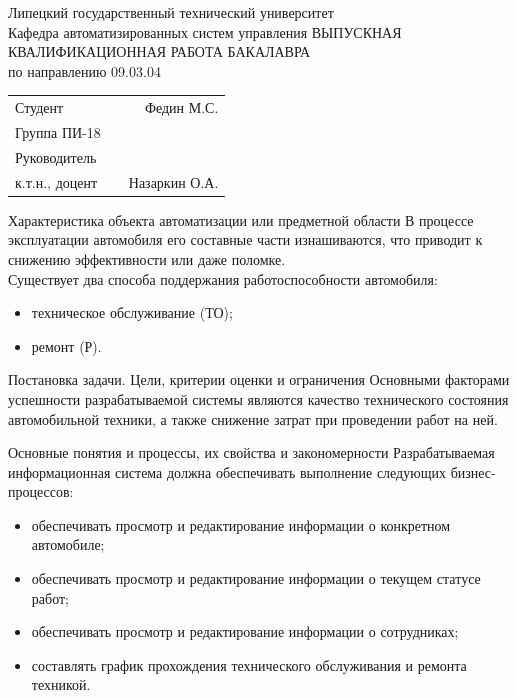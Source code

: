 \documentclass{beamer}
\begin{document}
\begin{frame}
    \begin{center}
        Липецкий государственный технический университет\\
        Кафедра автоматизированных систем управления
        \vfill
        \uppercase{ВЫПУСКНАЯ КВАЛИФИКАЦИОННАЯ РАБОТА БАКАЛАВРА}\\
        по направлению 09.03.04 \\
    \end{center}
    \vfill
    \begin{tabularx}{\textwidth}{Lm{4cm}R}
        Студент & & Федин М.С. \\
        Группа ПИ-18 & & \\
        Руководитель & & \\
        к.т.н., доцент & & Назаркин О.А.
    \end{tabularx}
\end{frame}

\begin{frame}
    {Характеристика объекта автоматизации или предметной области}
    В процессе эксплуатации автомобиля его составные части изнашиваются, что
    приводит к снижению эффективности или даже поломке.
    \\[\baselineskip]

    Существует два способа поддержания работоспособности автомобиля:
    \begin{itemize}
        \item техническое обслуживание (ТО);
        \item ремонт (Р).
    \end{itemize}
\end{frame}

\begin{frame}
	{Постановка задачи. Цели, критерии оценки и ограничения}
    Основными факторами успешности разрабатываемой системы являются качество
    технического состояния автомобильной техники, а также снижение затрат при
    проведении работ на ней.
\end{frame}

\begin{frame}
	{Основные понятия и процессы, их свойства и закономерности}
    Разрабатываемая информационная система должна обеспечивать выполнение
    следующих бизнес-процессов:
    \begin{itemize}
      \item обеспечивать просмотр и редактирование информации о конкретном
        автомобиле;
      \item обеспечивать просмотр и редактирование информации о текущем статусе
        работ;
      \item обеспечивать просмотр и редактирование информации о сотрудниках;

      \item составлять график прохождения технического обслуживания и ремонта
        техникой.
    \end{itemize}
\end{frame}
\end{document}
